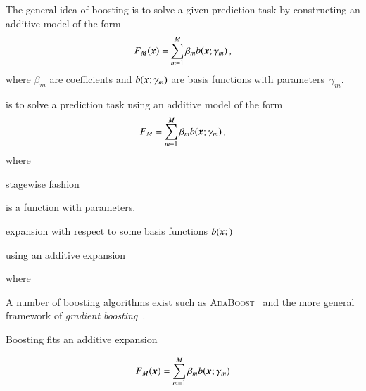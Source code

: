 The general idea of boosting is to solve a given prediction task by constructing
an additive model of the form
\begin{align*}
  F_{M}(\myvec{x}) = \sum_{m = 1}^{M} \beta_m b(\myvec{x}; \gamma_m) \,\text{,}
\end{align*}
where $\beta_m$ are coefficients and $b(\myvec{x}; \gamma_m)$ are basis
functions with parameters~$\gamma_{m}$.























is to solve a prediction task using an additive
model of the form
\begin{align*}
  F_{M} = \sum_{m = 1}^{M} \beta_m b(\myvec{x}; \gamma_m) \,\text{,}
\end{align*}
where






stagewise fashion


is a function with
parameters.







expansion with respect to some basis functions $b(\myvec{x}; )$





using an additive expansion



where




A number of boosting algorithms exist such as
\textsc{AdaBoost}~\cite{freund_shapire:adaboost,freund_shapire:adaboost2} and
the more general framework of \emph{gradient boosting}~\cite{Friedman:2001wbq}.





Boosting fits an additive expansion

\begin{align*}
  F_M(\myvec{x}) = \sum_{m = 1}^{M} \beta_m b(\myvec{x}; \gamma_{m})
\end{align*}


